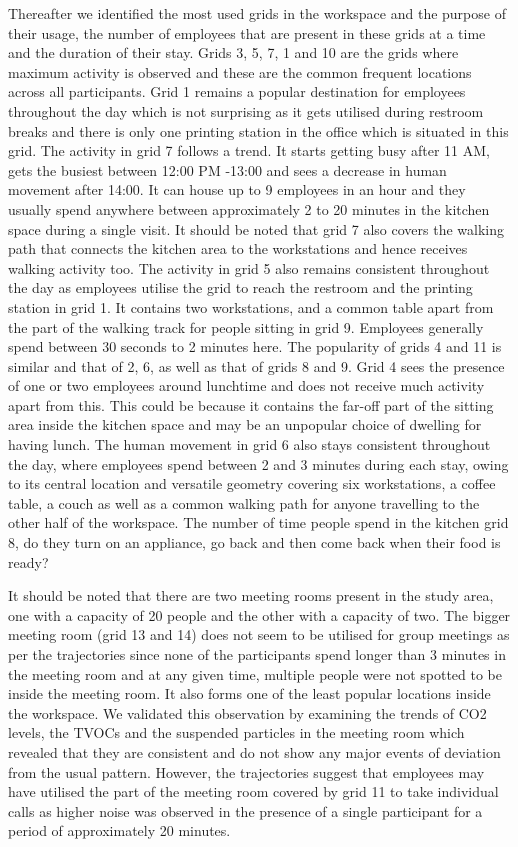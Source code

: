 \documentclass[acmtog]{acmart}
\begin{document}
Thereafter we identified the most used grids in the workspace and the purpose of their usage, the number of employees that are present in these grids at a time and the duration of their stay. Grids 3, 5, 7, 1 and 10 are the grids where maximum activity is observed and these are the common frequent locations across all participants. Grid 1 remains a popular destination for employees throughout the day which is not surprising as it gets utilised during restroom breaks and there is only one printing station in the office which is situated in this grid. The activity in grid 7 follows a trend. It starts getting busy after 11 AM, gets the busiest between 12:00 PM -13:00 and sees a decrease in human movement after 14:00. It can house up to 9 employees in an hour and they usually spend anywhere between approximately 2 to 20 minutes in the kitchen space during a single visit. It should be noted that grid 7 also covers the walking path that connects the kitchen area to the workstations and hence receives walking activity too. The activity in grid 5 also remains consistent throughout the day as employees utilise the grid to reach the restroom and the printing station in grid 1. It contains two workstations, and a common table apart from the part of the walking track for people sitting in grid 9. Employees generally spend between 30 seconds to 2 minutes here.  The popularity of grids 4 and 11 is similar and that of 2, 6, as well as that of grids 8 and 9. Grid 4 sees the presence of one or two employees around lunchtime and does not receive much activity apart from this. This could be because it contains the far-off part of the sitting area inside the kitchen space and may be an unpopular choice of dwelling for having lunch. The human movement in grid 6 also stays consistent throughout the day, where employees spend between 2 and 3 minutes during each stay, owing to its central location and versatile geometry covering six workstations, a coffee table, a couch as well as a common walking path for anyone travelling to the other half of the workspace. The number of time people spend in the kitchen grid 8, do they turn on an appliance, go back and then come back when their food is ready?

It should be noted that there are two meeting rooms present in the study area, one with a capacity of 20 people and the other with a capacity of two. The bigger meeting room (grid 13 and 14) does not seem to be utilised for group meetings as per the trajectories since none of the participants spend longer than 3 minutes in the meeting room and at any given time, multiple people were not spotted to be inside the meeting room. It also forms one of the least popular locations inside the workspace. We validated this observation by examining the trends of CO2 levels, the TVOCs and the suspended particles in the meeting room which revealed that they are consistent and do not show any major events of deviation from the usual pattern. However, the trajectories suggest that employees may have utilised the part of the meeting room covered by grid 11 to take individual calls as higher noise was observed in the presence of a single participant for a period of approximately 20 minutes.
\end{document}
